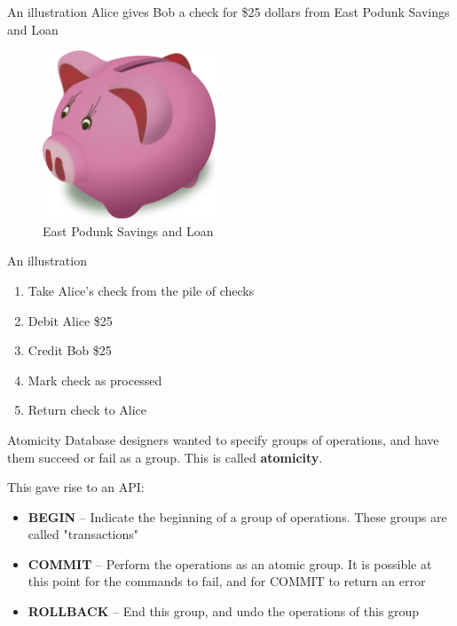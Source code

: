 \documentclass[svgnames]{beamer}
\begin{document}
\begin{frame}{An illustration}
    Alice gives Bob a check for \$25 dollars from East Podunk Savings and
    Loan
    \begin{figure}
        \includegraphics[height=5cm]{bank}
        \\ East Podunk Savings and Loan
    \end{figure}
\end{frame}

\begin{frame}{An illustration}
    \begin{enumerate}
        \item Take Alice's check from the pile of checks
        \item Debit Alice \$25
        \item Credit Bob \$25
        \item Mark check as processed
        \item Return check to Alice
    \end{enumerate}
\end{frame}

\begin{frame}{Atomicity}
    Database designers wanted to specify groups of operations, and have them
    succeed or fail as a group. This is called \textbf{atomicity}.

    This gave rise to an API:
    \begin{itemize}
        \item \textbf{BEGIN} -- Indicate the beginning of a group of
        operations. These groups are called "transactions"
        \item \textbf{COMMIT} -- Perform the operations as an atomic group. It
        is possible at this point for the commands to fail, and for COMMIT to
        return an error
        \item \textbf{ROLLBACK} -- End this group, and undo the operations of
        this group
    \end{itemize}
\end{frame}
\end{document}
